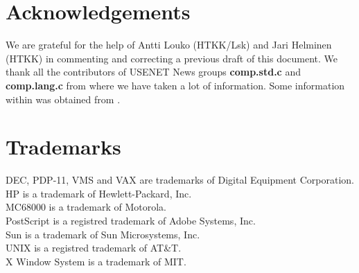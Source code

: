 \section{Acknowledgements}

We are grateful for the help of Antti Louko (HTKK/Lsk) and Jari Helminen (HTKK)
in commenting and
correcting a previous draft of this document. We thank all the
contributors of USENET News groups {\bf comp.std.c} and {\bf comp.lang.c} from
where we have taken
a lot of information. Some information within was obtained from
\cite{kn:HP}.

\section{Trademarks}
{
\footnotesize
DEC, PDP-11, VMS and VAX are trademarks of Digital Equipment Corporation. \\
HP is a trademark of Hewlett-Packard, Inc.\\
MC68000 is a trademark of Motorola.\\
PostScript is a registred trademark of Adobe Systems, Inc.\\
Sun is a trademark of Sun Microsystems, Inc. \\
UNIX is a registred trademark of AT\&T. \\
X Window System is a trademark of MIT.\\
}


